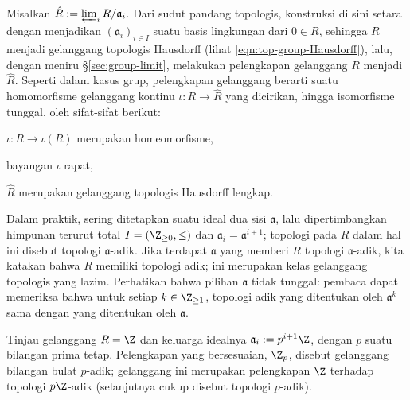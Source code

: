 \begin{remark}\label{rem:ring-completion} 
	Misalkan $\hat{R} := \varprojlim_i R/\mathfrak{a}_i$. Dari sudut pandang topologis, konstruksi di sini setara dengan menjadikan $(\mathfrak{a}_i)_{i \in I}$ suatu basis lingkungan dari $0 \in R$, sehingga $R$ menjadi gelanggang topologis Hausdorff (lihat \eqref{eqn:top-group-Hausdorff}), lalu, dengan meniru \S\ref{sec:group-limit}, melakukan pelengkapan gelanggang $R$ menjadi $\hat{R}$. Seperti dalam kasus grup, pelengkapan gelanggang berarti suatu homomorfisme gelanggang kontinu $\iota: R \to \hat{R}$ yang dicirikan, hingga isomorfisme tunggal, oleh sifat-sifat berikut:
	\begin{compactenum}[\bfseries {CO}.1]
		\item $\iota: R \to \iota(R)$ merupakan homeomorfisme,
		\item bayangan $\iota$ rapat,
		\item $\hat{R}$ merupakan gelanggang topologis Hausdorff lengkap.
	\end{compactenum}
	Dalam praktik, sering ditetapkan suatu ideal dua sisi $\mathfrak{a}$, lalu dipertimbangkan himpunan terurut total $I = (\Z_{\geq 0}, \leq)$ dan $\mathfrak{a}_i = \mathfrak{a}^{i+1}$; topologi pada $R$ dalam hal ini disebut topologi $\mathfrak{a}$-adik. Jika terdapat $\mathfrak{a}$ yang memberi $R$ topologi $\mathfrak{a}$-adik, kita katakan bahwa $R$ memiliki topologi adik; ini merupakan kelas gelanggang topologis yang lazim. Perhatikan bahwa pilihan $\mathfrak{a}$ tidak tunggal: pembaca dapat memeriksa bahwa untuk setiap $k \in \Z_{\geq 1}$, topologi adik yang ditentukan oleh $\mathfrak{a}^k$ sama dengan yang ditentukan oleh $\mathfrak{a}$.
\end{remark}

\begin{example}\label{eg:Z_p}
	Tinjau gelanggang $R = \Z$ dan keluarga idealnya $\mathfrak{a}_i := p^{i+1} \Z$, dengan $p$ suatu bilangan prima tetap. Pelengkapan yang bersesuaian, $\Z_p$, disebut gelanggang bilangan bulat $p$-adik; gelanggang ini merupakan pelengkapan $\Z$ terhadap topologi $p\Z$-adik (selanjutnya cukup disebut topologi $p$-adik).
\end{example}

